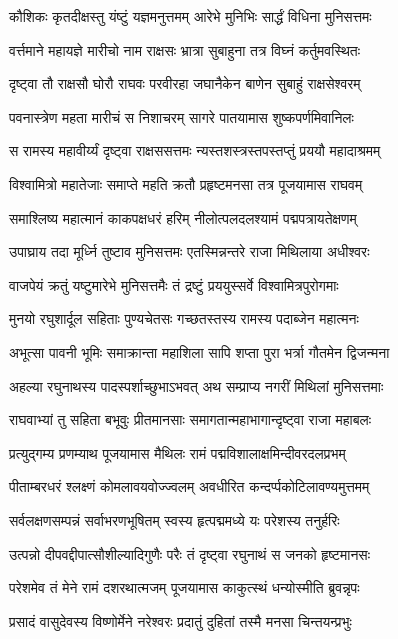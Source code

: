 \twolineshloka
{कौशिकः कृतदीक्षस्तु यंष्टुं यज्ञमनुत्तमम्}
{आरेभे मुनिभिः सार्द्धं विधिना मुनिसत्तमः}%

\twolineshloka
{वर्त्तमाने महायज्ञे मारीचो नाम राक्षसः}
{भ्रात्रा सुबाहुना तत्र विघ्नं कर्तुमवस्थितः}%

\twolineshloka
{दृष्ट्वा तौ राक्षसौ घोरौ राघवः परवीरहा}
{जघानैकेन बाणेन सुबाहुं राक्षसेश्वरम्}%

\twolineshloka
{पवनास्त्रेण महता मारीचं स निशाचरम्}
{सागरे पातयामास शुष्कपर्णमिवानिलः}%

\twolineshloka
{स रामस्य महावीर्य्यं दृष्ट्वा राक्षससत्तमः}
{न्यस्तशस्त्रस्तपस्तप्तुं प्रययौ महादाश्रमम्}%

\twolineshloka
{विश्वामित्रो महातेजाः समाप्ते महति क्रतौ}
{प्रहृष्टमनसा तत्र पूजयामास राघवम्}%

\twolineshloka
{समाश्लिष्य महात्मानं काकपक्षधरं हरिम्}
{नीलोत्पलदलश्यामं पद्मपत्रायतेक्षणम्}%

\twolineshloka
{उपाघ्राय तदा मूर्ध्नि तुष्टाव मुनिसत्तमः}
{एतस्मिन्नन्तरे राजा मिथिलाया अधीश्वरः}%

\twolineshloka
{वाजपेयं क्रतुं यष्टुमारेभे मुनिसत्तमैः}
{तं द्रष्टुं प्रययुस्सर्वे विश्वामित्रपुरोगमाः}%

\twolineshloka
{मुनयो रघुशार्दूल सहिताः पुण्यचेतसः}
{गच्छतस्तस्य रामस्य पदाब्जेन महात्मनः}%

\twolineshloka
{अभूत्सा पावनी भूमिः समाक्रान्ता महाशिला}
{सापि शप्ता पुरा भर्त्रा गौतमेन द्विजन्मना}%

\twolineshloka
{अहल्या रघुनाथस्य पादस्पर्शाच्छुभाऽभवत्}
{अथ सम्प्राप्य नगरीं मिथिलां मुनिसत्तमाः}%

\twolineshloka
{राघवाभ्यां तु सहिता बभूवुः प्रीतमानसाः}
{समागतान्महाभागान्दृष्ट्वा राजा महाबलः}%

\twolineshloka
{प्रत्युद्गम्य प्रणम्याथ पूजयामास मैथिलः}
{रामं पद्मविशालाक्षमिन्दीवरदलप्रभम्}%

\twolineshloka
{पीताम्बरधरं श्लक्ष्णं कोमलावयवोज्ज्वलम्}
{अवधीरित कन्दर्प्पकोटिलावण्यमुत्तमम्}%

\twolineshloka
{सर्वलक्षणसम्पन्नं सर्वाभरणभूषितम्}
{स्वस्य हृत्पद्ममध्ये यः परेशस्य तनुर्हरिः}%

\twolineshloka
{उत्पन्नो दीपवद्दीपात्सौशील्यादिगुणैः परैः}
{तं दृष्ट्वा रघुनाथं स जनको हृष्टमानसः}%

\twolineshloka
{परेशमेव तं मेने रामं दशरथात्मजम्}
{पूजयामास काकुत्स्थं धन्योस्मीति ब्रुवन्नृपः}%

\twolineshloka
{प्रसादं वासुदेवस्य विष्णोर्मेने नरेश्वरः}
{प्रदातुं दुहितां तस्मै मनसा चिन्तयन्प्रभुः}%

